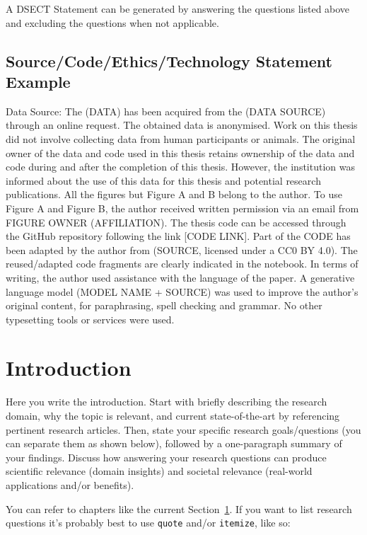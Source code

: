 \documentclass[11pt, a4paper]{article}
\begin{document}
A DSECT Statement can be generated by answering the questions listed above and excluding the questions when not applicable.\

\subsection{Source/Code/Ethics/Technology Statement Example} \label{subs:DESCT}
Data Source: 
The (DATA) has been acquired from the (DATA SOURCE) through an online request. The obtained data is anonymised. Work on this thesis did not involve collecting data from human participants or animals. The original owner of the data and code used in this thesis retains ownership of the data and code during and after the completion of this thesis. However, the institution was informed about the use of this data for this thesis and potential research publications.
All the figures but Figure A and B belong to the author. To use Figure A and Figure B, the author received written permission via an email from FIGURE OWNER (AFFILIATION). The thesis code can be accessed through the GitHub repository following the link [CODE LINK].
Part of the CODE has been adapted by the author from (SOURCE, licensed under a CC0 BY 4.0). The reused/adapted code fragments are clearly indicated in the notebook. In terms of writing, the author used assistance with the language of the paper. A generative language
model (MODEL NAME + SOURCE) was used to improve the author's original content, for paraphrasing, spell checking and grammar. No other typesetting tools or services were used.


\section{Introduction} \label{sec:introduction}

Here you write the introduction. Start with briefly describing the research domain, why the topic is relevant, and current state-of-the-art by referencing pertinent research articles. Then, state your specific research goals/questions (you can separate them as shown below), followed by a one-paragraph summary of your findings. Discuss how answering your research questions can produce scientific relevance (domain insights) and societal relevance (real-world applications and/or benefits). 

You can refer to chapters like the current Section~\ref{sec:introduction}. If you want to list research questions it's probably best to use \texttt{quote} and/or \texttt{itemize}, like so:
\end{document}
